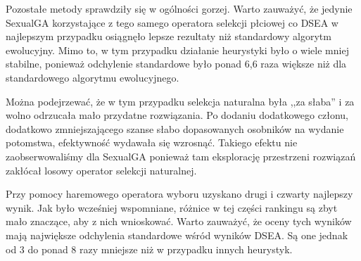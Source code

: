 \documentclass[./FM_mgr.tex]{subfiles}
\begin{document}
Pozostałe metody sprawdziły się w ogólności gorzej.
Warto zauważyć, że jedynie SexualGA korzystające z tego samego operatora selekcji płciowej co DSEA w najlepszym przypadku osiągnęło lepsze rezultaty niż standardowy algorytm ewolucyjny.
Mimo to, w tym przypadku działanie heurystyki było o wiele mniej stabilne, ponieważ odchylenie standardowe było ponad 6,6 raza większe niż dla standardowego algorytmu ewolucyjnego.

Można podejrzewać, że w tym przypadku selekcja naturalna była ,,za słaba'' i za wolno odrzucała mało przydatne rozwiązania.
Po dodaniu dodatkowego członu, dodatkowo zmniejszającego szanse słabo dopasowanych osobników na wydanie potomstwa, efektywność wydawała się wzrosnąć.
Takiego efektu nie zaobserwowaliśmy dla SexualGA ponieważ tam eksplorację przestrzeni rozwiązań zakłócał losowy operator selekcji naturalnej.

Przy pomocy haremowego operatora wyboru uzyskano drugi i czwarty najlepszy wynik.
Jak było wcześniej wspomniane, różnice w tej części rankingu są zbyt mało znaczące, aby z nich wnioskować.
Warto zauważyć, że oceny tych wyników mają największe odchylenia standardowe wśród wyników DSEA.
Są one jednak od 3 do ponad 8 razy mniejsze niż w przypadku innych heurystyk.
\end{document}
